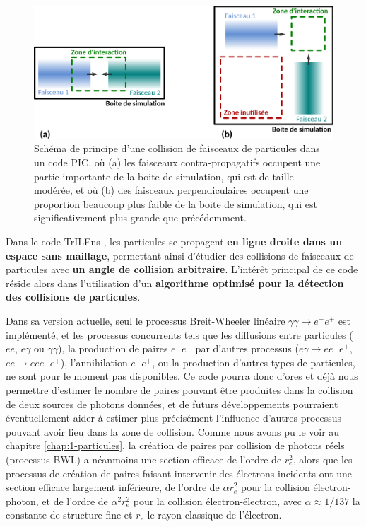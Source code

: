 \begin{refsection}
\begin{figure}[hbtp]
	\centering
	\includegraphics[width=\linewidth]{4-simulation/principe_TrILEns_PIC.png}
	\caption{Schéma de principe d'une collision de faisceaux de particules dans un code PIC, où (a) les faisceaux contra-propagatifs occupent une partie importante de la boite de simulation, qui est de taille modérée, et où (b) des faisceaux perpendiculaires occupent une proportion beaucoup plus faible de la boite de simulation, qui est significativement plus grande que précédemment.}
	\label{fig:4-trilens_PIC}
\end{figure}

Dans le code TrILEns \parencite{jansen_2018}, les particules se propagent \textbf{en ligne droite dans un espace sans maillage}, permettant ainsi d'étudier des collisions de faisceaux de particules avec \textbf{un angle de collision arbitraire}. L'intérêt principal de ce code réside alors dans l'utilisation d'un \textbf{algorithme optimisé pour la détection des collisions de particules}. 

Dans sa version actuelle, seul le processus Breit-Wheeler linéaire $\gamma\gamma\to e^- e^+$ est implémenté, et les processus concurrents tels que les diffusions entre particules ($e e$, $e\gamma$ ou $\gamma\gamma$), la production de paires $e^- e^+$ par d'autres processus ($e\gamma \to e e^- e^+$, $ee \to ee e^- e^+$), l'annihilation $e^-e^+$, ou la production d'autres types de particules, ne sont pour le moment pas disponibles. Ce code pourra donc d'ores et déjà nous permettre d'estimer le nombre de paires pouvant être produites dans la collision de deux sources de photons données, et de futurs développements pourraient éventuellement aider à estimer plus précisément l'influence d'autres processus pouvant avoir lieu dans la zone de collision. Comme nous avons pu le voir au chapitre \ref{chap:1-particules}, la création de paires par collision de photons réels (processus BWL) a néanmoins une section efficace de l'ordre de $r_e^2$, alors que les processus de création de paires faisant intervenir des électrons incidents ont une section efficace largement inférieure, de l'ordre de $\alpha r_e^2$ pour la collision électron-photon, et de l'ordre de $\alpha^2 r_e^2$ pour la collision électron-électron, avec $\alpha \approx 1/137$ la constante de structure fine et $r_e$ le rayon classique de l'électron.


\end{refsection}
